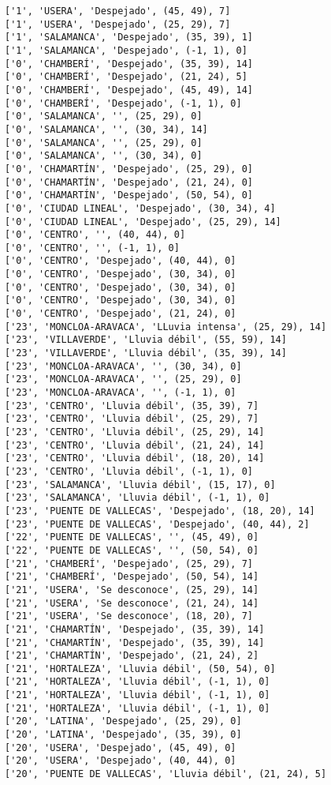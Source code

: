 \documentclass[11pt]{article}
\begin{document}
\begin{Verbatim}[commandchars=\\\{\}]
['1', 'USERA', 'Despejado', (45, 49), 7]
['1', 'USERA', 'Despejado', (25, 29), 7]
['1', 'SALAMANCA', 'Despejado', (35, 39), 1]
['1', 'SALAMANCA', 'Despejado', (-1, 1), 0]
['0', 'CHAMBERÍ', 'Despejado', (35, 39), 14]
['0', 'CHAMBERÍ', 'Despejado', (21, 24), 5]
['0', 'CHAMBERÍ', 'Despejado', (45, 49), 14]
['0', 'CHAMBERÍ', 'Despejado', (-1, 1), 0]
['0', 'SALAMANCA', '', (25, 29), 0]
['0', 'SALAMANCA', '', (30, 34), 14]
['0', 'SALAMANCA', '', (25, 29), 0]
['0', 'SALAMANCA', '', (30, 34), 0]
['0', 'CHAMARTÍN', 'Despejado', (25, 29), 0]
['0', 'CHAMARTÍN', 'Despejado', (21, 24), 0]
['0', 'CHAMARTÍN', 'Despejado', (50, 54), 0]
['0', 'CIUDAD LINEAL', 'Despejado', (30, 34), 4]
['0', 'CIUDAD LINEAL', 'Despejado', (25, 29), 14]
['0', 'CENTRO', '', (40, 44), 0]
['0', 'CENTRO', '', (-1, 1), 0]
['0', 'CENTRO', 'Despejado', (40, 44), 0]
['0', 'CENTRO', 'Despejado', (30, 34), 0]
['0', 'CENTRO', 'Despejado', (30, 34), 0]
['0', 'CENTRO', 'Despejado', (30, 34), 0]
['0', 'CENTRO', 'Despejado', (21, 24), 0]
['23', 'MONCLOA-ARAVACA', 'LLuvia intensa', (25, 29), 14]
['23', 'VILLAVERDE', 'Lluvia débil', (55, 59), 14]
['23', 'VILLAVERDE', 'Lluvia débil', (35, 39), 14]
['23', 'MONCLOA-ARAVACA', '', (30, 34), 0]
['23', 'MONCLOA-ARAVACA', '', (25, 29), 0]
['23', 'MONCLOA-ARAVACA', '', (-1, 1), 0]
['23', 'CENTRO', 'Lluvia débil', (35, 39), 7]
['23', 'CENTRO', 'Lluvia débil', (25, 29), 7]
['23', 'CENTRO', 'Lluvia débil', (25, 29), 14]
['23', 'CENTRO', 'Lluvia débil', (21, 24), 14]
['23', 'CENTRO', 'Lluvia débil', (18, 20), 14]
['23', 'CENTRO', 'Lluvia débil', (-1, 1), 0]
['23', 'SALAMANCA', 'Lluvia débil', (15, 17), 0]
['23', 'SALAMANCA', 'Lluvia débil', (-1, 1), 0]
['23', 'PUENTE DE VALLECAS', 'Despejado', (18, 20), 14]
['23', 'PUENTE DE VALLECAS', 'Despejado', (40, 44), 2]
['22', 'PUENTE DE VALLECAS', '', (45, 49), 0]
['22', 'PUENTE DE VALLECAS', '', (50, 54), 0]
['21', 'CHAMBERÍ', 'Despejado', (25, 29), 7]
['21', 'CHAMBERÍ', 'Despejado', (50, 54), 14]
['21', 'USERA', 'Se desconoce', (25, 29), 14]
['21', 'USERA', 'Se desconoce', (21, 24), 14]
['21', 'USERA', 'Se desconoce', (18, 20), 7]
['21', 'CHAMARTÍN', 'Despejado', (35, 39), 14]
['21', 'CHAMARTÍN', 'Despejado', (35, 39), 14]
['21', 'CHAMARTÍN', 'Despejado', (21, 24), 2]
['21', 'HORTALEZA', 'Lluvia débil', (50, 54), 0]
['21', 'HORTALEZA', 'Lluvia débil', (-1, 1), 0]
['21', 'HORTALEZA', 'Lluvia débil', (-1, 1), 0]
['21', 'HORTALEZA', 'Lluvia débil', (-1, 1), 0]
['20', 'LATINA', 'Despejado', (25, 29), 0]
['20', 'LATINA', 'Despejado', (35, 39), 0]
['20', 'USERA', 'Despejado', (45, 49), 0]
['20', 'USERA', 'Despejado', (40, 44), 0]
['20', 'PUENTE DE VALLECAS', 'Lluvia débil', (21, 24), 5]

\end{Verbatim}
\end{document}
